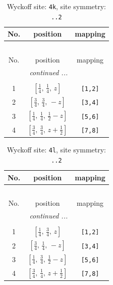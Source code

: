 \documentclass[fleqn,8pt]{jsarticle}
\begin{document}
\renewcommand{\arraystretch}{1.2}
\begin{longtable}{ccc}
\caption{Wyckoff site: {\tt 4k}, site symmetry: {\tt ..2}}
 \\
 \hline \hline
No. & position & mapping \\ \hline \endfirsthead

\multicolumn{2}{l}{\tablename\ \thetable{}} \\
 \hline \hline
No. & position & mapping \\ \hline \endhead

 \hline \hline
\multicolumn{2}{r}{\footnotesize\it continued ...} \\ \endfoot

 \hline \hline
\multicolumn{2}{r}{} \\ \endlastfoot

1 & $\left[ \frac{1}{4},\, \frac{1}{4},\, z \right]$ & {\tt [1,2]} \\ \hline
2 & $\left[ \frac{3}{4},\, \frac{3}{4},\, - z \right]$ & {\tt [3,4]} \\ \hline
3 & $\left[ \frac{1}{4},\, \frac{1}{4},\, \frac{1}{2} - z \right]$ & {\tt [5,6]} \\ \hline
4 & $\left[ \frac{3}{4},\, \frac{3}{4},\, z + \frac{1}{2} \right]$ & {\tt [7,8]} \\
\end{longtable}
\renewcommand{\arraystretch}{1.2}
\begin{longtable}{ccc}
\caption{Wyckoff site: {\tt 4l}, site symmetry: {\tt ..2}}
 \\
 \hline \hline
No. & position & mapping \\ \hline \endfirsthead

\multicolumn{2}{l}{\tablename\ \thetable{}} \\
 \hline \hline
No. & position & mapping \\ \hline \endhead

 \hline \hline
\multicolumn{2}{r}{\footnotesize\it continued ...} \\ \endfoot

 \hline \hline
\multicolumn{2}{r}{} \\ \endlastfoot

1 & $\left[ \frac{1}{4},\, \frac{3}{4},\, z \right]$ & {\tt [1,2]} \\ \hline
2 & $\left[ \frac{3}{4},\, \frac{1}{4},\, - z \right]$ & {\tt [3,4]} \\ \hline
3 & $\left[ \frac{1}{4},\, \frac{3}{4},\, \frac{1}{2} - z \right]$ & {\tt [5,6]} \\ \hline
4 & $\left[ \frac{3}{4},\, \frac{1}{4},\, z + \frac{1}{2} \right]$ & {\tt [7,8]} \\
\end{longtable}
\end{document}

